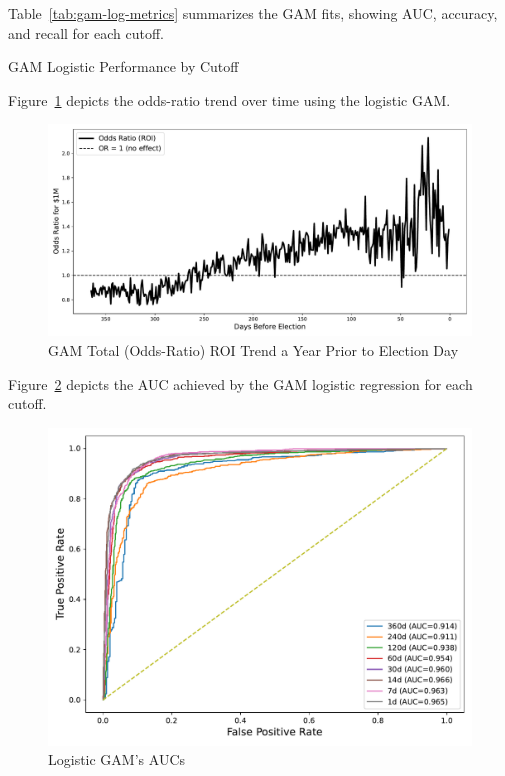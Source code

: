 Table~\ref{tab:gam-log-metrics} summarizes the GAM fits, showing AUC, accuracy, and recall for each cutoff.

\begin{table}[H]
	\centering
	
	\caption{GAM Logistic Performance by Cutoff}
	\label{tab:gam-log-metrics}
\end{table}

Figure~\ref{fig:gam-or} depicts the odds-ratio trend over time using the logistic GAM.

\begin{figure}[H]
	\centering
	\includegraphics[width = 0.8\linewidth]{../Figures/gam_roi_over_time.pdf}
	\caption {GAM Total (Odds-Ratio) ROI Trend a Year Prior to Election Day}
	\label{fig:gam-or}
\end{figure}

Figure~\ref{fig:gam-roc} depicts the AUC achieved by the GAM logistic regression for each cutoff.

\begin{figure}[H]
	\centering
	\includegraphics[width = 0.8\linewidth]{../Figures/gam_log_roc.pdf}
	\caption{Logistic GAM's AUCs}
	\label{fig:gam-roc}
\end{figure}

